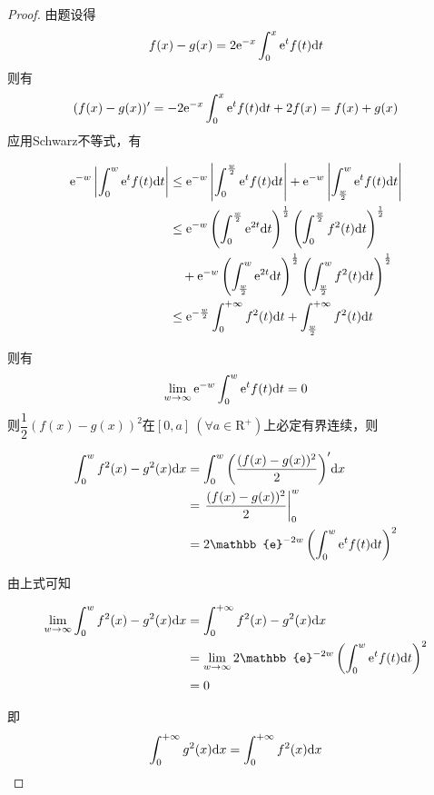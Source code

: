 \begin{proof}

    由题设得
    $$f(x) - g(x) = 2\mathrm{e}^{-x}\int_{0}^{x}{\mathrm{e}^tf(t)}\mathrm{d} t$$
    则有
    $$(f(x) - g(x))' = -2\mathrm{e}^{-x}\int_{0}^{x}{\mathrm{e}^tf(t)}\mathrm{d} t + 2f(x) = f(x) + g(x)$$
    应用\textup{Schwarz}不等式，有

    \begin{align*}
        \mathrm{e}^{-w} \left| \int_{0}^{w}{\mathrm{e}^tf(t)}\mathrm{d} t \right| & \leq \mathrm{e}^{-w} \left| \int_{0}^{\frac{w}{2}}{\mathrm{e}^tf(t)}\mathrm{d} t \right| + \mathrm{e}^{-w} \left| \int_{\frac{w}{2}}^{w}{\mathrm{e}^tf(t)}\mathrm{d} t \right| \\
        & \leq \mathrm{e}^{-w} \left( \int_{0}^{\frac{w}{2}}{\mathrm{e}^{2t}}\mathrm{d} t \right)^{\frac{1}{2}} \left( \int_{0}^{\frac{w}{2}}{f^2(t)}\mathrm{d} t \right)^{\frac{1}{2}} \\
        & \quad + \mathrm{e}^{-w} \left( \int_{\frac{w}{2}}^{w}{\mathrm{e}^{2t}}\mathrm{d} t \right)^{\frac{1}{2}} \left( \int_{\frac{w}{2}}^{w}{f^2(t)}\mathrm{d} t \right)^{\frac{1}{2}} \\
        & \leq \mathrm{e}^{-\frac{w}{2}} \int_{0}^{+\infty}{f^2(t)}\mathrm{d} t + \int_{\frac{w}{2}}^{+\infty}{f^2(t)}\mathrm{d} t
    \end{align*}

    则有
    $$\lim_{w\to\infty}{\mathrm{e}^{-w}\int_{0}^{w}{\mathrm{e}^tf(t)}\mathrm{d} t} = 0$$
    则$\dfrac{1}{2}(f(x) - g(x))^2$在$[0,a]\ (\forall a \in \mathrm{R}^+)$上必定有界连续，则

    \begin{align*}
        \int_{0}^{w}{f^2(x) - g^2(x)}\diff x & = \int_{0}^{w}{\left( \dfrac{(f(x) - g(x))^2}{2}\right)'}\diff x \\
        & = \left. \dfrac{(f(x) - g(x))^2}{2} \right|_{0}^{w} \\ 
        & = 2 \mathbb{e}^{-2w} \left( \int_{0}^{w}{\euler^tf(t)}\diff t \right)^2
    \end{align*}

    由上式可知

    \begin{align*}
        \lim_{w\to\infty}{\int_{0}^{w}{f^2(x) - g^2(x)}\diff x} & = \int_{0}^{+\infty}{f^2(x) - g^2(x)}\diff x \\
        & = \lim_{w\to\infty}{2 \mathbb{e}^{-2w} \left( \int_{0}^{w}{\euler^tf(t)}\diff t \right)^2} \\
        & = 0
    \end{align*}

    即
    $$\int_{0}^{+\infty}{g^2(x)}\mathrm{d} x = \int_{0}^{+\infty}{f^2(x)}\mathrm{d} x$$

\end{proof}

